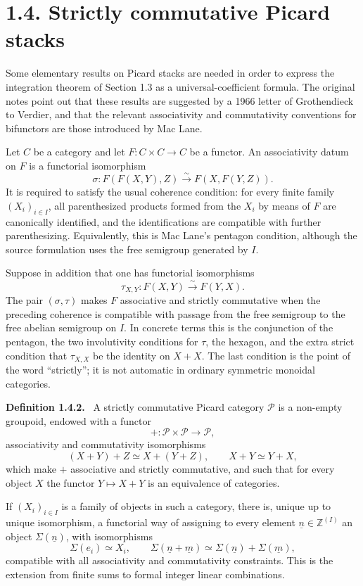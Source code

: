 \documentclass[12pt]{article}
\newcommand{\Pp}{\mathcal P}
\newcommand{\Zz}{\mathbb Z}
\newenvironment{statement}[1]{\par\medskip\noindent\textbf{#1.}\ }{\par\medskip}
\begin{document}
\section*{1.4. Strictly commutative Picard stacks}

Some elementary results on Picard stacks are needed in order to express the integration theorem of Section 1.3 as a universal-coefficient formula. The original notes point out that these results are suggested by a 1966 letter of Grothendieck to Verdier, and that the relevant associativity and commutativity conventions for bifunctors are those introduced by Mac Lane.

Let \(C\) be a category and let \(F:C\times C\to C\) be a functor. An associativity datum on \(F\) is a functorial isomorphism
\[
\sigma:F(F(X,Y),Z)\xrightarrow{\sim}F(X,F(Y,Z)).
\]
It is required to satisfy the usual coherence condition: for every finite family \((X_i)_{i\in I}\), all parenthesized products formed from the \(X_i\) by means of \(F\) are canonically identified, and the identifications are compatible with further parenthesizing. Equivalently, this is Mac Lane's pentagon condition, although the source formulation uses the free semigroup generated by \(I\).

Suppose in addition that one has functorial isomorphisms
\[
\tau_{X,Y}:F(X,Y)\xrightarrow{\sim}F(Y,X).
\]
The pair \((\sigma,\tau)\) makes \(F\) associative and strictly commutative when the preceding coherence is compatible with passage from the free semigroup to the free abelian semigroup on \(I\). In concrete terms this is the conjunction of the pentagon, the two involutivity conditions for \(\tau\), the hexagon, and the extra strict condition that \(\tau_{X,X}\) be the identity on \(X+X\). The last condition is the point of the word ``strictly''; it is not automatic in ordinary symmetric monoidal categories.

\begin{statement}{Definition 1.4.2}
A strictly commutative Picard category \(\Pp\) is a non-empty groupoid, endowed with a functor
\[
+:\Pp\times\Pp\to\Pp,
\]
associativity and commutativity isomorphisms
\[
(X+Y)+Z\simeq X+(Y+Z),\qquad X+Y\simeq Y+X,
\]
which make \(+\) associative and strictly commutative, and such that for every object \(X\) the functor \(Y\mapsto X+Y\) is an equivalence of categories.
\end{statement}

If \((X_i)_{i\in I}\) is a family of objects in such a category, there is, unique up to unique isomorphism, a functorial way of assigning to every element \(\underline n\in\Zz^{(I)}\) an object \(\Sigma(\underline n)\), with isomorphisms
\[
\Sigma(e_i)\simeq X_i,
\qquad
\Sigma(\underline n+\underline m)\simeq \Sigma(\underline n)+\Sigma(\underline m),
\]
compatible with all associativity and commutativity constraints. This is the extension from finite sums to formal integer linear combinations.
\end{document}
